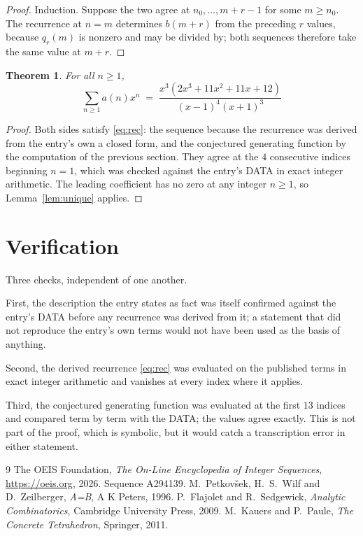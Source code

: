 \documentclass[11pt,a4paper]{article}
\theoremstyle{plain}
\newtheorem{theorem}{Theorem}
\theoremstyle{definition}
\begin{document}
\begin{proof}
Induction. Suppose the two agree at $n_{0},\dots,m+r-1$ for some $m\ge n_{0}$. The
recurrence at $n=m$ determines $b(m+r)$ from the preceding $r$ values, because $q_{r}(m)$
is nonzero and may be divided by; both sequences therefore take the same value at $m+r$.
\end{proof}

\begin{theorem}
For all $n\ge 1$,
\[
\sum_{n\ge 1} a(n)x^{n} \;=\; \frac{x^{3} \left(2 x^{3} + 11 x^{2} + 11 x + 12\right)}{\left(x - 1\right)^{4} \left(x + 1\right)^{3}}
\]
\end{theorem}

\begin{proof}
Both sides satisfy \eqref{eq:rec}: the sequence because the recurrence was derived from
the entry's own a closed form, and the conjectured generating function by the computation of the
previous section. They agree at the $4$ consecutive indices beginning
$n=1$, which was checked against the entry's DATA in exact integer arithmetic.
The leading coefficient has no zero at any integer $n\ge1$, so
Lemma~\ref{lem:unique} applies.
\end{proof}

\section{Verification}

Three checks, independent of one another.

First, the description the entry states as fact was itself confirmed against the entry's
DATA before any recurrence was derived from it; a statement that did not reproduce the
entry's own terms would not have been used as the basis of anything.

Second, the derived recurrence \eqref{eq:rec} was evaluated on the published terms in
exact integer arithmetic and vanishes at every index where it applies.

Third, the conjectured generating function was evaluated at the first $13$ indices and
compared term by term with the DATA; the values agree exactly. This is not part of the
proof, which is symbolic, but it would catch a transcription error in either statement.

\begin{thebibliography}{9}
 The OEIS Foundation, \emph{The On-Line Encyclopedia of Integer Sequences},
\url{https://oeis.org}, 2026. Sequence A294139.
 M.~Petkov\v{s}ek, H.~S.~Wilf and D.~Zeilberger, \emph{A=B}, A K Peters,
1996.
 P.~Flajolet and R.~Sedgewick, \emph{Analytic Combinatorics}, Cambridge
University Press, 2009.
 M.~Kauers and P.~Paule, \emph{The Concrete Tetrahedron}, Springer, 2011.
\end{thebibliography}
\end{document}
